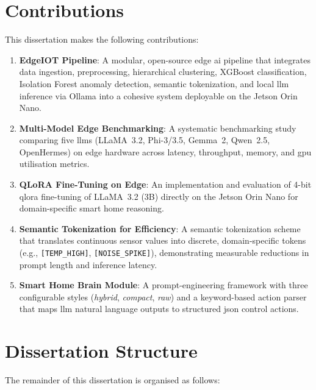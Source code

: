 \documentclass[12pt,a4paper,oneside]{report}
\begin{document}
\section{Contributions}
\label{sec:intro-contributions}

This dissertation makes the following contributions:

\begin{enumerate}
    \item \textbf{EdgeIOT Pipeline}: A modular, open-source edge \gls{ai} pipeline that integrates data ingestion, preprocessing, hierarchical clustering, XGBoost classification, Isolation Forest anomaly detection, semantic tokenization, and local \gls{llm} inference via Ollama into a cohesive system deployable on the Jetson Orin Nano.

    \item \textbf{Multi-Model Edge Benchmarking}: A systematic benchmarking study comparing five \glspl{llm} (LLaMA~3.2, Phi-3/3.5, Gemma~2, Qwen~2.5, OpenHermes) on edge hardware across latency, throughput, memory, and \gls{gpu} utilisation metrics.

    \item \textbf{QLoRA Fine-Tuning on Edge}: An implementation and evaluation of 4-bit \gls{qlora} fine-tuning of LLaMA~3.2 (3B) directly on the Jetson Orin Nano for domain-specific smart home reasoning.

    \item \textbf{Semantic Tokenization for Efficiency}: A semantic tokenization scheme that translates continuous sensor values into discrete, domain-specific tokens (e.g., \texttt{[TEMP\_HIGH]}, \texttt{[NOISE\_SPIKE]}), demonstrating measurable reductions in prompt length and inference latency.

    \item \textbf{Smart Home Brain Module}: A prompt-engineering framework with three configurable styles (\textit{hybrid}, \textit{compact}, \textit{raw}) and a keyword-based action parser that maps \gls{llm} natural language outputs to structured \gls{json} control actions.
\end{enumerate}


\section{Dissertation Structure}
\label{sec:intro-structure}

The remainder of this dissertation is organised as follows:
\end{document}
